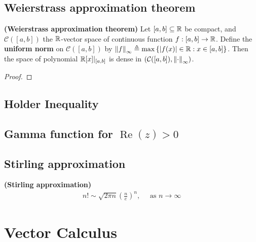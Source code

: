 \documentclass{report}
\begin{document}
\section{Weierstrass approximation theorem} 

\begin{theorem}
\label{THWat}
\textbf{(Weierstrass approximation theorem)} Let $[a,b]\subseteq \mathbb{R}$ be compact, and $\mathcal{C}([a,b])$ the $\mathbb{R}$-vector space of continuous function $f:[a,b]\rightarrow \mathbb{R}$. Define the \textbf{uniform norm} on $\mathcal{C}([a,b])$ by $\left\| f \right\|_{\infty} \triangleq \max \left\{ \left|f(x)\right| \in\mathbb{R}: x \in [a,b] \right\}$. Then the space of polynomial $\mathbb{R}[x]|_{[a,b]}$ is dense in $\left(\mathcal{C}([a,b]), \left\| \cdot \right\|_{\infty} \right)$. 
\end{theorem}
\begin{proof}

\end{proof}


\section{Holder Inequality}
\section{Gamma function for $\operatorname{Re}(z)>0$}
\section{Stirling approximation}
\begin{theorem}
\textbf{(Stirling approximation)} 
\begin{align*}
n!\sim \sqrt{2\pi n} \left(\frac{n}{e} \right)^n  ,\quad \text{ as }n\rightarrow \infty
\end{align*}
\end{theorem}
\chapter{Vector Calculus}
\end{document}
